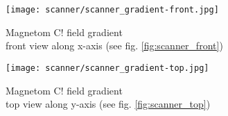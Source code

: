 \begin{figure}[!htb]
  	\centering
    \texttt{[image: scanner/scanner\_gradient-front.jpg]}
    \caption{Magnetom C! field gradient\\ front view along x-axis (see fig. \ref{fig:scanner_front}) \cite{magnetom_handbook}}
    \label{fig:gradient_front}
    \end{figure}

\begin{figure}[!htb]
  	\centering
    \texttt{[image: scanner/scanner\_gradient-top.jpg]}
    \caption{Magnetom C! field gradient\\ top view along y-axis (see fig. \ref{fig:scanner_top}) \cite{magnetom_handbook}}
    \label{fig:gradient_top}
\end{figure}


%



